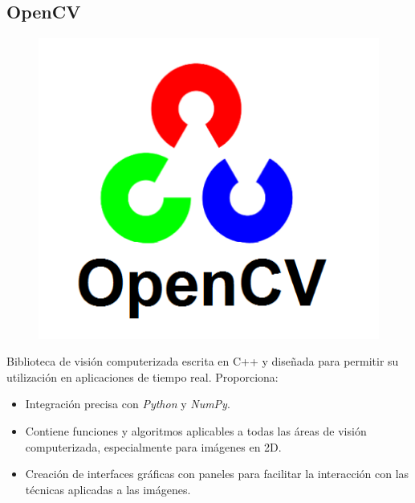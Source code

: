 \subsection{OpenCV}
\begin{figure}
  \includegraphics[scale=0.3]{imagenes/logos/opencv_logo.png}
\end{figure}
Biblioteca de visión computerizada escrita en C++ y diseñada para
permitir su utilización en aplicaciones de tiempo real. Proporciona:
\begin{itemize}
\item Integración precisa con \emph{Python} y \emph{NumPy}.
\item Contiene funciones y algoritmos aplicables a todas las áreas de
  visión computerizada, especialmente para imágenes en 2D.
\item Creación de interfaces gráficas con paneles para
  facilitar la interacción con las técnicas aplicadas a las imágenes.
\end{itemize}

